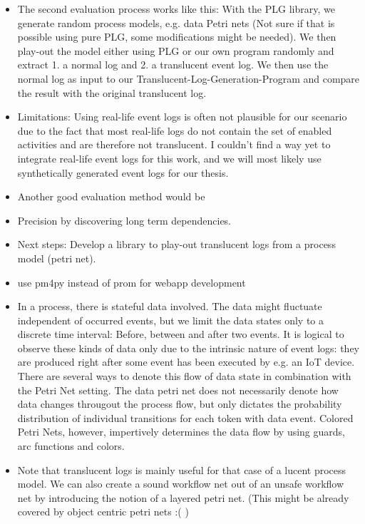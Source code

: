 \documentclass[a4paper,11pt,twoside]{pads-thesis}
\begin{document}
\begin{itemize}
        \item The second evaluation process works like this: With the PLG library, we generate random process models, e.g. data Petri nets (Not sure if that is possible using pure PLG, some modifications might be needed). We then play-out the model either using PLG or our own program randomly and extract 1. a normal log and 2. a translucent event log. We then use the normal log as input to our Translucent-Log-Generation-Program and compare the result with the original translucent log.

       \item Limitations: Using real-life event logs is often not plausible for our scenario due to the fact that most real-life logs do not contain the set of enabled activities and are therefore not translucent. I couldn't find a way yet to integrate real-life event logs for this work, and we will most likely use synthetically generated event logs for our thesis.

       \item Another good evaluation method would be 

        \item Precision by discovering long term dependencies.

        \item Next steps: Develop a library to play-out translucent logs from a process model (petri net).

        \item use pm4py instead of prom for webapp development

        \item In a process, there is stateful data involved. The data might fluctuate independent of occurred events, but we limit the data states only to a discrete time interval: Before, between and after two events. It is logical to observe these kinds of data only due to the intrinsic nature of event logs: they are produced right after some event has been executed by e.g. an IoT device. There are several ways to denote this flow of data state in combination with the Petri Net setting. The data petri net does not necessarily denote how data changes througout the process flow, but only dictates the probability distribution of individual transitions for each token with data event. Colored Petri Nets, however, impertively determines the data flow by using guards, arc functions and colors.
        
        \item Note that translucent logs is mainly useful for that case of a lucent process model. We can also create a sound workflow net out of an unsafe workflow net by introducing the notion of a layered petri net. (This might be already covered by object centric petri nets :( )
    \end{itemize}
    
\end{document}
